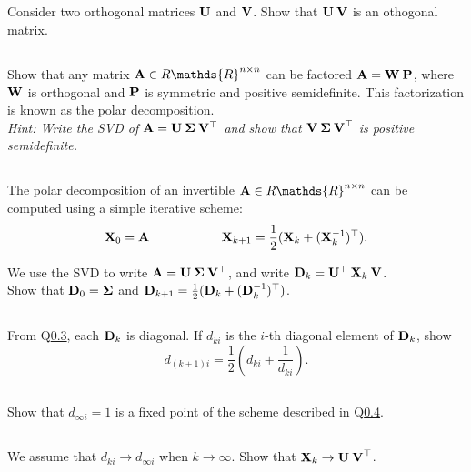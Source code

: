\subsection{} Consider two orthogonal matrices ${\bf U}$ and ${\bf V}$. Show that ${\bf U\:V}$ is an othogonal matrix.

\subsection{} Show that any matrix  ${\bf A} \in R\mathds{R}^{n \times n}$ can be factored ${\bf A} = {\bf W\:P}$, where  ${\bf W}$ is orthogonal and  ${\bf P}$ is symmetric and positive semidefinite. This factorization is known as the polar decomposition.\\
\textit{Hint: Write the SVD of ${\bf A} = {\bf U \: \Sigma \: V^\top}$ and show that ${\bf V \: \Sigma \: V}^\top$ is positive semidefinite.}

\subsection{}\label{scheme} The polar decomposition of an invertible ${\bf A} \in R\mathds{R}^{n \times n}$ can be computed using a simple iterative scheme:
$$ {\bf X}_0 = {\bf A} \text{\hspace{2cm}} {\bf X}_{k+1} = \frac{1}{2}({\bf X}_k + ({\bf X}_k^{-1})^\top).$$

We use the SVD to write ${\bf A} = {\bf U \: \Sigma \: V^\top}$, and write  ${\bf D}_k = {\bf U}^\top \: {\bf X}_k \: {\bf V}$.\\ Show that ${\bf D}_0 = {\bf \Sigma}$ and ${\bf D}_{k+1} = \frac{1}{2}({\bf D}_k + ({\bf D}_k^{-1})^\top)$.

\subsection{}\label{scheme_diag} From Q\ref{scheme}, each ${\bf D}_k$ is diagonal. If $d_{ki}$ is the $i$-th diagonal element of ${\bf D}_k$, show
$$ d_{(k+1)i} = \frac{1}{2} \left(d_{ki} + \frac{1}{d_{ki}}\right). $$


\subsection{}\label{conv} Show that $d_{\infty i} = 1$ is a fixed point of the scheme described in Q\ref{scheme_diag}.

\subsection{} We assume that $d_{ki} \to d_{\infty i}$ when $k \to \infty$. Show that ${\bf X}_k \to {\bf U \: V}^\top$.

